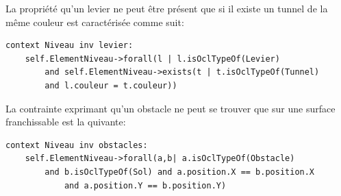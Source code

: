 La propriété qu'un levier ne peut être présent que si il existe un tunnel de la même couleur est caractérisée comme suit:

\begin{lstlisting}[caption=Contrainte sur la présence d'un levier,captionpos=b,label={lst:présencelevier},language=OCL]
context Niveau inv levier:
    self.ElementNiveau->forall(l | l.isOclTypeOf(Levier) 
        and self.ElementNiveau->exists(t | t.isOclTypeOf(Tunnel)
        and l.couleur = t.couleur))
\end{lstlisting}

La contrainte exprimant qu'un obstacle ne peut se trouver que sur une surface franchissable est la quivante:

\begin{lstlisting}[caption=Contrainte sur les obstacles,captionpos=b,label={lst:posobstacles},language=OCL]
context Niveau inv obstacles:
    self.ElementNiveau->forall(a,b| a.isOclTypeOf(Obstacle) 
        and b.isOclTypeOf(Sol) and a.position.X == b.position.X 
            and a.position.Y == b.position.Y)
\end{lstlisting}
